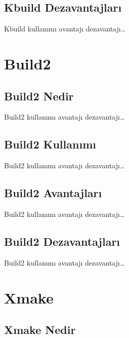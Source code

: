 \documentclass[
]{book}
\begin{document}
\hypertarget{kbuild-dezavantajlarux131}{%
\section{Kbuild Dezavantajları}\label{kbuild-dezavantajlarux131}}

Kbuild kullanımı avantajı dezavantajı\ldots{}

\hypertarget{build2}{%
\chapter{Build2}\label{build2}}

\hypertarget{build2-nedir}{%
\section{Build2 Nedir}\label{build2-nedir}}

Build2 kullanımı avantajı dezavantajı\ldots{}

\hypertarget{build2-kullanux131mux131}{%
\section{Build2 Kullanımı}\label{build2-kullanux131mux131}}

Build2 kullanımı avantajı dezavantajı\ldots{}

\hypertarget{build2-avantajlarux131}{%
\section{Build2 Avantajları}\label{build2-avantajlarux131}}

Build2 kullanımı avantajı dezavantajı\ldots{}

\hypertarget{build2-dezavantajlarux131}{%
\section{Build2 Dezavantajları}\label{build2-dezavantajlarux131}}

Build2 kullanımı avantajı dezavantajı\ldots{}

\hypertarget{xmake}{%
\chapter{Xmake}\label{xmake}}

\hypertarget{xmake-nedir}{%
\section{Xmake Nedir}\label{xmake-nedir}}
\end{document}
